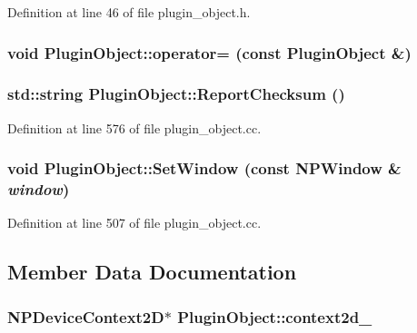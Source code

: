 Definition at line 46 of file plugin\_\-object.h.

\hypertarget{class_plugin_object_a45243a3f962f41eb71fe0eeba7501262}{
\subsubsection[{operator=}]{\setlength{\rightskip}{0pt plus 5cm}void PluginObject::operator= (const {\bf PluginObject} \&)}}
\label{class_plugin_object_a45243a3f962f41eb71fe0eeba7501262}
\hypertarget{class_plugin_object_a0ab936e960c08282554224a4570540aa}{
\subsubsection[{ReportChecksum}]{\setlength{\rightskip}{0pt plus 5cm}std::string PluginObject::ReportChecksum ()}}
\label{class_plugin_object_a0ab936e960c08282554224a4570540aa}


Definition at line 576 of file plugin\_\-object.cc.

\hypertarget{class_plugin_object_a2a2774a67eadffc3f78d60e6c0559cf0}{
\subsubsection[{SetWindow}]{\setlength{\rightskip}{0pt plus 5cm}void PluginObject::SetWindow (const {\bf NPWindow} \& {\em window})}}
\label{class_plugin_object_a2a2774a67eadffc3f78d60e6c0559cf0}


Definition at line 507 of file plugin\_\-object.cc.



\subsection{Member Data Documentation}
\hypertarget{class_plugin_object_ac4e47e096e7046c00152e0979a120059}{
\subsubsection[{context2d\_\-}]{\setlength{\rightskip}{0pt plus 5cm}NPDeviceContext2D$\ast$ {\bf PluginObject::context2d\_\-}}}
\label{class_plugin_object_ac4e47e096e7046c00152e0979a120059}


